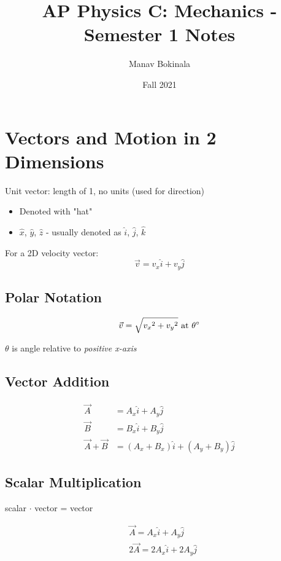 \documentclass[titlepage]{article}
\title{AP Physics C: Mechanics - Semester 1 Notes}
\author{Manav Bokinala}
\date{Fall 2021}
\begin{document}
\maketitle

\newpage
\tableofcontents
\newpage

\section{Vectors and Motion in 2 Dimensions}
Unit vector: length of 1, no units (used for direction)

\begin{itemize}
    \item Denoted with "hat"
    \item $\hat{x}$, $\hat{y}$, $\hat{z}$ - usually denoted as $\hat{i}$, $\hat{j}$, $\hat{k}$
\end{itemize}

For a 2D velocity vector:
\[ \vec{v} = v_x \hat{i} + v_y \hat{j} \]

\subsection{Polar Notation}
\[ \vec{v} = \sqrt{{v_x}^2 + {v_y}^2} \text{ at } \theta \degree \]

$\theta$ is angle relative to \emph{positive x-axis}

\subsection{Vector Addition}
\begin{align*}
    \vec{A}           & = A_x \hat{i} + A_y \hat{j}                 \\
    \vec{B}           & = B_x \hat{i} + B_y \hat{j}                 \\
    \vec{A} + \vec{B} & = (A_x + B_x) \hat{i} + (A_y + B_y) \hat{j}
\end{align*}

\subsection{Scalar Multiplication}
scalar $\cdot$ vector = vector

\begin{align*}
     & \vec{A} = A_x \hat{i} + A_y \hat{j}    \\
     & 2\vec{A} = 2A_x \hat{i} + 2A_y \hat{j}
\end{align*}
\end{document}
